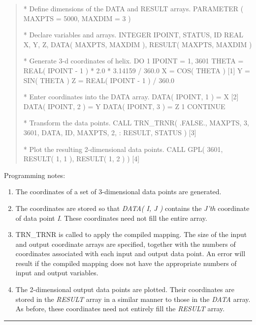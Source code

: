 \documentclass[twoside,nolof,11pt]{starlink}
\providecommand{\name}[1]{\small{#1}}
\providecommand{\fortvar}[1]{\emph{#1}}
\providecommand{\exampledone}[0]{\begin{center} \rule{6em}{0.2mm} \end{center}}
\begin{document}
\begin{quote}
\begin{terminalv}
*  Define dimensions of the DATA and RESULT arrays.
      PARAMETER ( MAXPTS = 5000, MAXDIM = 3 )

*  Declare variables and arrays.
      INTEGER IPOINT, STATUS, ID
      REAL X, Y, Z, DATA( MAXPTS, MAXDIM ), RESULT( MAXPTS, MAXDIM )

*  Generate 3-d coordinates of helix.
      DO 1 IPOINT = 1, 3601
         THETA = REAL( IPOINT - 1 ) * 2.0 * 3.14159 / 360.0
         X = COS( THETA )                              [1]
         Y = SIN( THETA )
         Z = REAL( IPOINT - 1 ) / 360.0

*  Enter coordinates into the DATA array.
         DATA( IPOINT, 1 ) = X                         [2]
         DATA( IPOINT, 2 ) = Y
         DATA( IPOINT, 3 ) = Z
    1 CONTINUE

*  Transform the data points.
      CALL TRN_TRNR( .FALSE., MAXPTS, 3, 3601, DATA, ID, MAXPTS, 2,
     :               RESULT, STATUS )                  [3]

*  Plot the resulting 2-dimensional data points.
      CALL GPL( 3601, RESULT( 1, 1 ), RESULT( 1, 2 ) ) [4]

\end{terminalv}
\end{quote}

Programming notes:

\begin{enumerate}

\item The coordinates of a set of 3-dimensional data points are generated.

\item The coordinates are stored so that \fortvar{DATA( I, J )} contains the
\fortvar{J'th} coordinate of data point \fortvar{I}.
These coordinates need not fill the entire array.

\item \name{TRN\_TRNR} is called to apply the compiled mapping.
The size of the input and output coordinate arrays are specified, together
with the numbers of coordinates associated with each input and output data
point.
An error will result if the compiled mapping does not have the appropriate
numbers of input and output variables.

\item The 2-dimensional output data points are plotted.
Their coordinates are stored in the \fortvar{RESULT} array in a similar
manner to those in the \fortvar{DATA} array.
As before, these coordinates need not entirely fill the \fortvar{RESULT}
array.

\end{enumerate}
\exampledone
\end{document}
